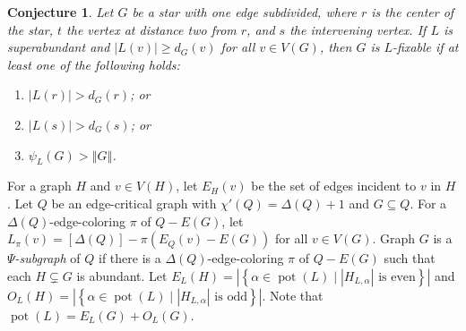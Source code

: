 \documentclass[12pt]{article}
\theoremstyle{plain}
\newtheorem{conjecture}[thm]{Conjecture}
\theoremstyle{definition}
\theoremstyle{remark}
\newcommand{\setb}[3]{\left\{ #1 \in #2 \mid #3 \right\}}
\newcommand{\card}[1]{\left|#1\right|}
\newcommand{\size}[1]{\left\Vert#1\right\Vert}
\newcommand{\irange}[1]{\left[#1\right]}
\newcommand{\parens}[1]{\left( #1 \right)}
\newcommand{\pot}{\operatorname{pot}}
\begin{document}
\begin{conjecture}
\label{StarWithOneEdgeSubdivided}
Let $G$ be a star with one edge subdivided, where $r$ is the center of the
star, $t$ the vertex at distance two from $r$, and $s$ the intervening vertex.  
If $L$ is superabundant and $|L(v)| \ge d_G(v)$ for all 
$v \in V(G)$, then $G$ is $L$-fixable if at least one of the following holds:
\begin{enumerate}
\item[(a)] $|L(r)| > d_G(r)$; or
\item[(b)] $|L(s)| > d_G(s)$; or
\item[(c)] $\psi_L(G) > \size{G}$.
\end{enumerate}
\end{conjecture}

For a graph $H$ and $v \in V(H)$, let $E_H(v)$ be the set of edges incident to
$v$ in $H$. Let $Q$ be an edge-critical graph with $\chi'(Q) = \Delta(Q) + 1$
and $G \subseteq Q$.  For a $\Delta(Q)$-edge-coloring $\pi$ of $Q - E(G)$, let
$L_\pi(v) = \irange{\Delta(Q)} - \pi\parens{E_Q(v) - E(G)}$ for all $v \in
V(G)$.  Graph $G$ is a \emph{$\Psi$-subgraph} of $Q$ if there is a
$\Delta(Q)$-edge-coloring $\pi$ of $Q - E(G)$ such that each $H \subsetneq G$
is abundant. Let $E_{L}(H) = \card{\setb{\alpha}{\pot(L)}{\card{H_{L, \alpha}}
\text{ is even}}}$ and $O_{L}(H) = \card{\setb{\alpha}{\pot(L)}{\card{H_{L,
\alpha}} \text{ is odd}}}$.  Note that $\pot(L) = E_{L}(G) + O_{L}(G)$.
\end{document}
